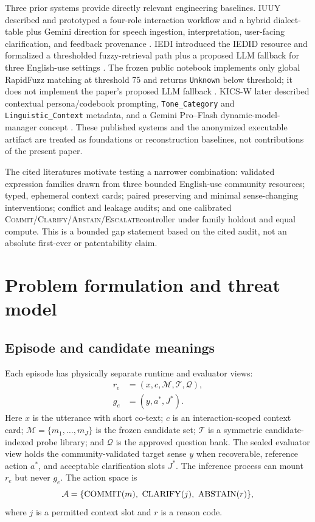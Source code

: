 \documentclass[preprint,12pt,authoryear]{elsarticle}
\newcommand{\commit}{\ifmmode\operatorname{COMMIT}\else\textsc{Commit}\fi}
\newcommand{\clarify}{\ifmmode\operatorname{CLARIFY}\else\textsc{Clarify}\fi}
\newcommand{\abstain}{\ifmmode\operatorname{ABSTAIN}\else\textsc{Abstain/Escalate}\fi}
\begin{document}
Three prior systems provide directly relevant engineering baselines. IUUY described and
prototyped a four-role interaction workflow and a hybrid dialect-table plus
Gemini direction for speech ingestion, interpretation, user-facing
clarification, and feedback provenance \citep{mba2025iuuy}. IEDI introduced
the IEDID resource and formalized a thresholded fuzzy-retrieval path plus a
proposed LLM fallback for three English-use settings \citep{mba2025iedi}. The
frozen public notebook implements only global RapidFuzz matching at threshold
75 and returns \texttt{Unknown} below threshold; it does not implement the
paper's proposed LLM fallback \citep{iedinotebook}. KICS-W later described
contextual persona/codebook prompting, \texttt{Tone\_Category} and
\texttt{Linguistic\_Context} metadata, and a Gemini Pro--Flash dynamic-model-
manager concept \citep{mba2026persona}. These published systems and the
anonymized executable artifact are treated as foundations or reconstruction
baselines, not contributions of the present paper.

The cited literatures motivate testing a narrower combination: validated
expression families drawn from three bounded English-use community resources;
typed, ephemeral context cards;
paired preserving and minimal sense-changing interventions; conflict and
leakage audits; and one calibrated \commit/\clarify/\abstain controller under
family holdout and equal compute. This is a bounded gap statement based on the
cited audit, not an absolute first-ever or patentability claim.

\section{Problem formulation and threat model}

\subsection{Episode and candidate meanings}

Each episode has physically separate runtime and evaluator views:
\begin{align}
r_e&=(x,c,\mathcal{M},\mathcal{T},\mathcal{Q}),\\
g_e&=(y,a^*,J^*).
\end{align}
Here $x$ is the utterance with short co-text; $c$ is an interaction-scoped
context card; $\mathcal{M}=\{m_1,\ldots,m_J\}$ is the frozen candidate set;
$\mathcal{T}$ is a symmetric candidate-indexed probe library; and
$\mathcal{Q}$ is the approved question bank. The sealed evaluator view holds
the community-validated target sense $y$ when recoverable, reference action
$a^*$, and acceptable clarification slots $J^*$. The inference process can
mount $r_e$ but never $g_e$. The action space is
\begin{equation}
\mathcal{A}=\{\commit(m),\ \clarify(j),\ \abstain(r)\},
\end{equation}
where $j$ is a permitted context slot and $r$ is a reason code.
\end{document}
